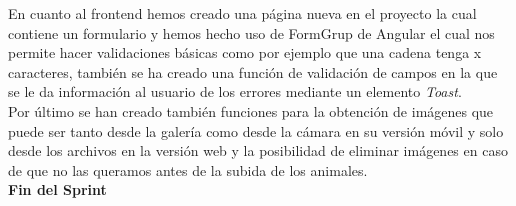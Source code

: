 En cuanto al frontend hemos creado una página nueva en el proyecto la cual contiene un formulario y hemos hecho uso de FormGrup de Angular el cual nos permite hacer validaciones básicas como por ejemplo que una cadena tenga x caracteres, también se ha creado una función de validación de campos en la que se le da información al usuario de los errores mediante un elemento \textit{Toast}. \\

Por último se han creado también funciones para la obtención de imágenes que puede ser tanto desde la galería como desde la cámara en su versión móvil y solo desde los archivos en la versión web y la posibilidad de eliminar imágenes en caso de que no las queramos antes de la subida de los animales.\\

\textbf{Fin del Sprint}

